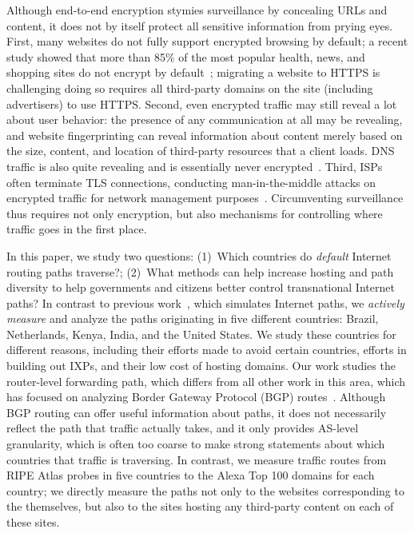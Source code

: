 Although end-to-end encryption stymies surveillance by
concealing URLs and content, it does not by itself protect all sensitive
information from prying eyes. First, many websites do not fully support
encrypted browsing by default; a recent study showed that more than 85\%
of the most popular health, news, and shopping sites do not encrypt by
default~\cite{what_isps_can_see}; migrating a website to HTTPS is
challenging doing so requires all third-party domains on the site
(including advertisers) to use HTTPS.  Second, even encrypted traffic
may still reveal a lot about user behavior: the presence of any
communication at all may be revealing, and website fingerprinting can
reveal information about content merely based on the size, content, and
location of third-party resources that a client loads. DNS traffic is
also quite revealing and is essentially never
encrypted~\cite{what_isps_can_see}.  Third, ISPs often terminate TLS
connections, conducting man-in-the-middle attacks on encrypted traffic
for network management purposes~\cite{mitm_isp}. Circumventing
surveillance thus requires not only encryption, but also mechanisms
for controlling where traffic goes in the first place. 

In this paper, we study two questions: (1)~Which countries do {\em
  default} Internet routing paths traverse?; (2)~What methods can help
increase hosting and path diversity to help governments and citizens
better control transnational Internet paths?  In contrast to previous
work~\cite{karlin2009nation}, which simulates Internet paths, we
\textit{actively measure} and analyze the paths originating in five
different countries: Brazil, Netherlands, Kenya, India, and the United
States.  We study these countries for different reasons, including their
efforts made to avoid certain countries, efforts in building out IXPs,
and their low cost of hosting domains.  Our work studies the
router-level forwarding path, which differs from all other work in this
area, which has focused on analyzing Border Gateway Protocol
(BGP) routes~\cite{karlin2009nation,shah2015characterizing}.  Although
BGP routing can offer useful information about paths, it does not
necessarily reflect the path that traffic actually takes, and it only
provides AS-level granularity, which is often too coarse to make strong
statements about which countries that traffic is traversing.  In
contrast, we measure traffic routes from RIPE Atlas probes in five
countries to the Alexa Top 100 domains for each country; we directly
measure the paths not only to the websites corresponding to the
themselves, but also to the sites hosting any third-party content on
each of these sites.

